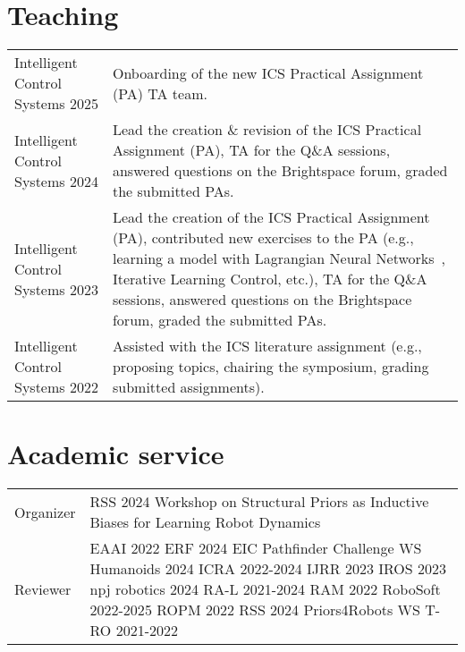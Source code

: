 \section*{Teaching}
\noindent
\begin{longtable}{p{} p{}}
    Intelligent Control \newline Systems 2025 & Onboarding of the new ICS Practical Assignment (PA) TA team.\\
    Intelligent Control \newline Systems 2024 & Lead the creation \& revision of the ICS Practical Assignment (PA), TA for the Q\&A sessions, answered questions on the Brightspace forum, graded the submitted PAs.\\
    Intelligent Control \newline Systems 2023 & Lead the creation of the ICS Practical Assignment (PA), contributed new exercises to the PA (e.g., learning a model with Lagrangian Neural Networks~\cite{lutter2019deep}, Iterative Learning Control, etc.), TA for the Q\&A sessions, answered questions on the Brightspace forum, graded the submitted PAs.\\
    Intelligent Control \newline Systems 2022 & Assisted with the ICS literature assignment (e.g., proposing topics, chairing the symposium, grading submitted assignments).\\
\end{longtable}

\section*{Academic service}
\noindent
\begin{longtable}{p{} p{}}
    Organizer & RSS 2024 Workshop on Structural Priors as Inductive Biases for Learning Robot Dynamics\\
    Reviewer & 
        EAAI 2022 \newline
        ERF 2024 EIC Pathfinder Challenge WS \newline
        Humanoids 2024 \newline
        ICRA 2022-2024 \newline 
        IJRR 2023 \newline
        IROS 2023 \newline
        npj robotics 2024 \newline
        RA-L 2021-2024 \newline
        RAM 2022 \newline
        RoboSoft 2022-2025 \newline
        ROPM 2022 \newline
        RSS 2024 Priors4Robots WS \newline
        T-RO 2021-2022
    \\
\end{longtable}